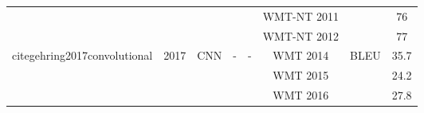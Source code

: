 \documentclass[12pt, a4paper, oneside]{report}
\begin{document}
\begin{tabular}{|c|c|c|c|c|c|cc|}
                                                                          &                       &                                   &                                         &                                                                                                        & WMT-NT 2011                           & \multicolumn{1}{c|}{}                                                                                                              & 76     \\ \cline{6-6} \cline{8-8} 
                                                                          &                       &                                   &                                         &                                                                                                        & WMT-NT 2012                           & \multicolumn{1}{c|}{}                                                                                                              & 77     \\ \hline
    \multirow{3}{*}{cite{gehring2017convolutional}}     & \multirow{3}{*}{2017} & \multirow{3}{*}{CNN}              & \multirow{3}{*}{-}                      & \multirow{3}{*}{-}                                                                                     & WMT 2014                              & \multicolumn{1}{c|}{\multirow{3}{*}{BLEU}}                                                                                         & 35.7   \\ \cline{6-6} \cline{8-8} 
                                                                          &                       &                                   &                                         &                                                                                                        & WMT 2015                              & \multicolumn{1}{c|}{}                                                                                                              & 24.2   \\ \cline{6-6} \cline{8-8} 
                                                                          &                       &                                   &                                         &                                                                                                        & WMT 2016                              & \multicolumn{1}{c|}{}                                                                                                              & 27.8   \\ \hline

\end{tabular}
\end{document}
